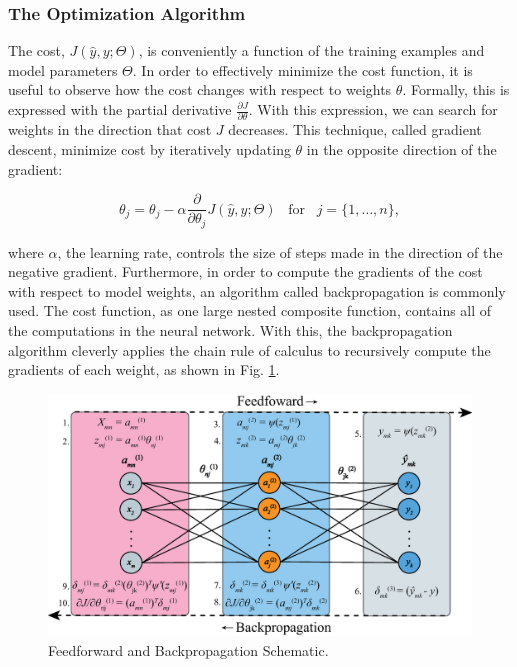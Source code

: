 \subsubsection{The Optimization Algorithm}
The cost, $J(\hat{y}, y; \Theta)$, is conveniently a function of the training examples and model parameters $\Theta$. In order to effectively minimize the cost function, it is useful to observe how the cost changes with respect to weights $\theta$. Formally, this is expressed with the partial derivative $\frac{\partial J}{\partial \theta}$. With this expression, we can search for weights in the direction that cost $J$ decreases. This technique, called gradient descent, minimize cost by iteratively updating $\theta$ in the opposite direction of the gradient:

\begin{equation}\label{eq:update}
    \theta_j = \theta_j - \alpha \frac{\partial}{\partial \theta_j} J(\hat{y},y;\Theta) \;\;\; \mbox{for} \;\;\; j = \{1,\ldots,n\},
\end{equation}

\noindent
where $\alpha$, the learning rate, controls the size of steps made in the direction of the negative gradient. Furthermore, in order to compute the gradients of the cost with respect to model weights, an algorithm called backpropagation is commonly used. The cost function, as one large nested composite function, contains all of the computations in the neural network. With this, the backpropagation algorithm cleverly applies the chain rule of calculus to recursively compute the gradients of each weight, as shown in Fig. \ref{fig:backprop}. 


\begin{figure}[htb]
    \centering
    \includegraphics[width=\textwidth]{img/backprop.eps}
    \caption{Feedforward and Backpropagation Schematic.}
    \label{fig:backprop}
\end{figure}

